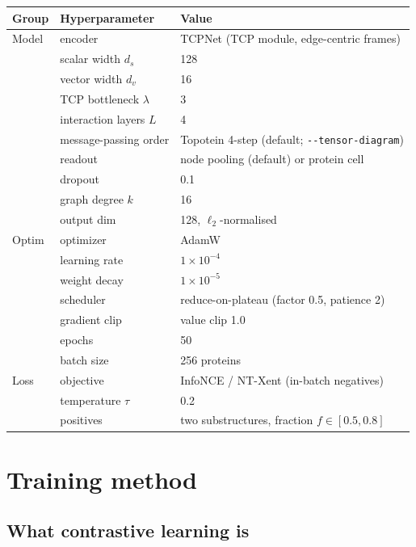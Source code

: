 \documentclass[11pt,a4paper]{article}
\theoremstyle{definition}
\begin{document}
\begin{center}
\begin{tabular}{@{}l l l@{}}
\toprule
Group & Hyperparameter & Value\\
\midrule
Model & encoder                & TCPNet (TCP module, edge-centric frames)\\
      & scalar width $d_s$      & 128\\
      & vector width $d_v$      & 16\\
      & TCP bottleneck $\lambda$ & 3\\
      & interaction layers $L$  & 4\\
      & message-passing order   & Topotein 4-step (default; \texttt{-{}-tensor-diagram})\\
      & readout                 & node pooling (default) or protein cell\\
      & dropout                & 0.1\\
      & graph degree $k$       & 16\\
      & output dim             & 128, $\ell_2$-normalised\\
\midrule
Optim & optimizer              & AdamW\\
      & learning rate          & $1\times10^{-4}$\\
      & weight decay           & $1\times10^{-5}$\\
      & scheduler              & reduce-on-plateau (factor 0.5, patience 2)\\
      & gradient clip          & value clip 1.0\\
      & epochs                 & 50\\
      & batch size             & 256 proteins\\
\midrule
Loss  & objective              & InfoNCE / NT-Xent (in-batch negatives)\\
      & temperature $\tau$      & 0.2\\
      & positives               & two substructures, fraction $f\in[0.5,0.8]$\\
\bottomrule
\end{tabular}
\end{center}

\section{Training method}
\label{sec:training}

\subsection{What contrastive learning is}
\end{document}
